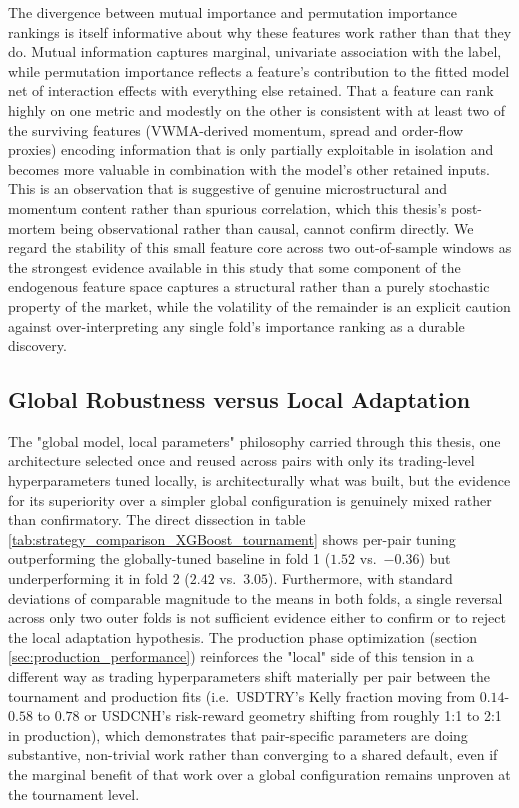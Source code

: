 \documentclass[12pt, a4paper]{article}
\begin{document}
\medskip

The divergence between mutual importance and permutation importance rankings is itself informative about why these features work rather than that they do. Mutual information captures 
marginal, univariate association with the label, while permutation importance reflects a feature's contribution to the fitted model net of interaction effects with everything 
else retained. That a feature can rank highly on one metric and modestly on the other is consistent with at least two of the surviving features (VWMA-derived momentum, spread and 
order-flow proxies) encoding information that is only partially exploitable in isolation and becomes more valuable in combination with the model's other retained inputs. 
This is an observation that is suggestive of genuine microstructural and momentum content rather than spurious correlation, which this thesis's post-mortem being observational rather 
than causal, cannot confirm directly. We regard the stability of this small feature core across two out-of-sample windows as the strongest evidence available in this study that 
some component of the endogenous feature space captures a structural rather than a purely stochastic property of the market, while the volatility of the remainder is an explicit 
caution against over-interpreting any single fold's importance ranking as a durable discovery.


\subsection{Global Robustness versus Local Adaptation}

The "global model, local parameters" philosophy carried through this thesis, one architecture selected once and reused across pairs with only its trading-level hyperparameters 
tuned locally, is architecturally what was built, but the evidence for its superiority over a simpler global configuration is genuinely mixed rather than confirmatory. The direct 
dissection in table \ref{tab:strategy_comparison_XGBoost_tournament} shows per-pair tuning outperforming the globally-tuned baseline in fold 1 ($1.52$ vs.\ $-0.36$) but 
underperforming it in fold 2 ($2.42$ vs.\ $3.05$). Furthermore, with standard deviations of comparable magnitude to the means in both folds, a single reversal across only two outer 
folds is not sufficient evidence either to confirm or to reject the local adaptation hypothesis. The production phase optimization (section \ref{sec:production_performance}) 
reinforces the "local" side of this tension in a different way as trading hyperparameters shift materially per pair between the tournament and production fits 
(i.e.\ USDTRY's Kelly fraction moving from $0.14$-$0.58$ to $0.78$ or USDCNH's risk-reward geometry shifting from roughly 1:1 to 2:1 in production), which demonstrates that 
pair-specific parameters are doing substantive, non-trivial work rather than converging to a shared default, even if the marginal benefit of that work over a global configuration 
remains unproven at the tournament level.
\end{document}
